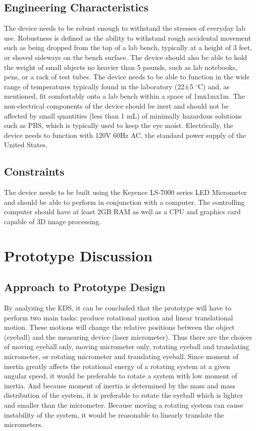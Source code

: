 \documentclass{article}
\begin{document}
\subsection{Engineering Characteristics}
The device needs to be robust enough to withstand the stresses of everyday lab use. Robustness is defined as the ability to withstand rough accidental movement such as being dropped from the top of a lab bench, typically at a height of 3 feet, or shoved sideways on the bench surface. The device should also be able to hold the weight of small objects no heavier than 5 pounds, such as lab notebooks, pens, or a rack of test tubes. The device needs to be able to function in the wide range of temperatures typically found in the laboratory (22±5 $^\circ$C) and, as mentioned, fit comfortably onto a lab bench within a space of 1mx1mx1m. The non‐electrical components of the device should be inert and should not be affected by small quantities (less than 1 mL) of minimally hazardous solutions such as PBS\cite{users_manual}, which is typically used to keep the eye moist. Electrically, the device needs to function with 120V 60Hz AC, the standard power supply of the United States.

\subsection{Constraints}
The device needs to be built using the Keyence LS‐7000 series LED Micrometer and should be able to perform in conjunction with a computer. The controlling computer should have at least 2GB RAM as well as a CPU and graphics card capable of 3D image processing.


\section{Prototype Discussion}
\subsection{Approach to Prototype Design}
By analyzing the EDS, it can be concluded that the prototype will have to perform two main tasks: produce rotational motion and linear translational motion. These motions will change the relative positions between the object (eyeball) and the measuring device (laser micrometer). Thus there are the choices of moving eyeball only, moving micrometer only, rotating eyeball and translating micrometer, or rotating micrometer and translating eyeball. Since moment of inertia greatly affects the rotational energy of a rotating system at a given angular speed, it would be preferable to rotate a system with low moment of inertia. And because moment of inertia is determined by the mass and mass distribution of the system, it is preferable to rotate the eyeball which is lighter and smaller than the micrometer. Because moving a rotating system can cause instability of the system, it would be reasonable to linearly translate the micrometers. 
\end{document}

